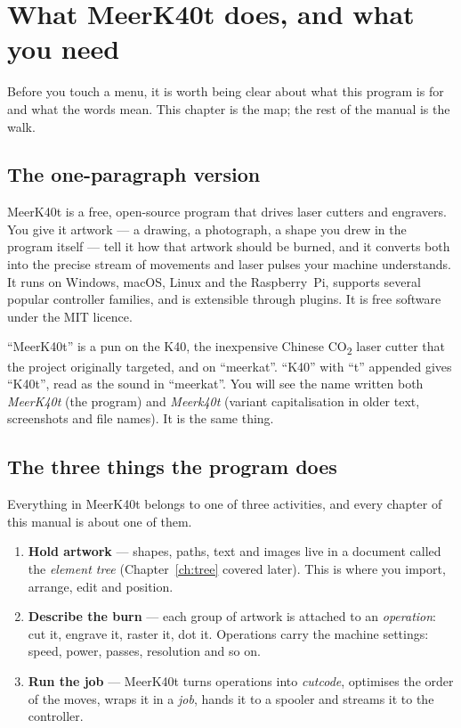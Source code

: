 \chapter{What MeerK40t does, and what you need}
\label{ch:intro}

Before you touch a menu, it is worth being clear about what this program is for
and what the words mean. This chapter is the map; the rest of the manual is the
walk.

\section{The one-paragraph version}

MeerK40t is a free, open-source program that drives laser cutters and engravers.
You give it artwork --- a drawing, a photograph, a shape you drew in the program
itself --- tell it how that artwork should be burned, and it converts both into
the precise stream of movements and laser pulses your machine understands. It
runs on Windows, macOS, Linux and the Raspberry~Pi, supports several popular
controller families, and is extensible through plugins. It is free software under
the MIT licence.

\begin{behindbox}
``MeerK40t'' is a pun on the K40, the inexpensive Chinese CO\textsubscript{2}
laser cutter that the project originally targeted, and on ``meerkat''. ``K40''
with ``t'' appended gives ``K40t'', read as the sound in ``meerkat''. You will
see the name written both \emph{MeerK40t} (the program) and \emph{Meerk40t}
(variant capitalisation in older text, screenshots and file names). It is the
same thing.
\end{behindbox}

\section{The three things the program does}

Everything in MeerK40t belongs to one of three activities, and every chapter of
this manual is about one of them.

\begin{enumerate}[leftmargin=1.6em]
  \item \textbf{Hold artwork} --- shapes, paths, text and images live in a
        document called the \emph{element tree} (Chapter~\ref{ch:tree} covered
        later). This is where you import, arrange, edit and position.
  \item \textbf{Describe the burn} --- each group of artwork is attached to an
        \emph{operation}: cut it, engrave it, raster it, dot it. Operations carry
        the machine settings: speed, power, passes, resolution and so on.
  \item \textbf{Run the job} --- MeerK40t turns operations into
        \emph{cutcode}, optimises the order of the moves, wraps it in a
        \emph{job}, hands it to a spooler and streams it to the controller.
\end{enumerate}

